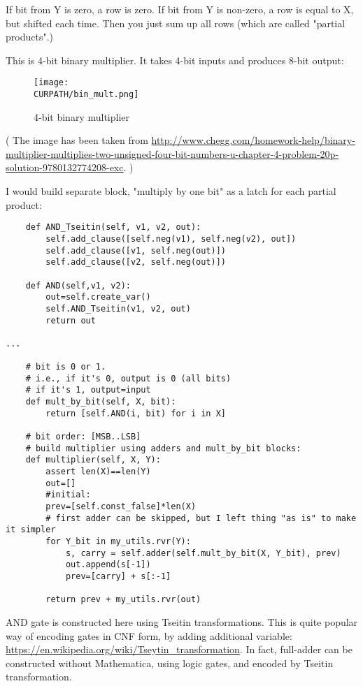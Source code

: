 If bit from Y is zero, a row is zero.
If bit from Y is non-zero, a row is equal to X, but shifted each time.
Then you just sum up all rows (which are called "partial products".)

This is 4-bit binary multiplier. It takes 4-bit inputs and produces 8-bit output:

\begin{figure}[H]
\centering
\texttt{[image: \\CURPATH/bin\_mult.png]}
\caption{4-bit binary multiplier}
\end{figure}

( The image has been taken from \url{http://www.chegg.com/homework-help/binary-multiplier-multiplies-two-unsigned-four-bit-numbers-u-chapter-4-problem-20p-solution-9780132774208-exc}. )

I would build separate block, "multiply by one bit" as a latch for each partial product:

\begin{lstlisting}
    def AND_Tseitin(self, v1, v2, out):
        self.add_clause([self.neg(v1), self.neg(v2), out])
        self.add_clause([v1, self.neg(out)])
        self.add_clause([v2, self.neg(out)])
    
    def AND(self,v1, v2):
        out=self.create_var()
        self.AND_Tseitin(v1, v2, out)
        return out

...

    # bit is 0 or 1.
    # i.e., if it's 0, output is 0 (all bits)
    # if it's 1, output=input
    def mult_by_bit(self, X, bit):
        return [self.AND(i, bit) for i in X]

    # bit order: [MSB..LSB]
    # build multiplier using adders and mult_by_bit blocks:
    def multiplier(self, X, Y):
        assert len(X)==len(Y)
        out=[]
        #initial:
        prev=[self.const_false]*len(X)
        # first adder can be skipped, but I left thing "as is" to make it simpler
        for Y_bit in my_utils.rvr(Y):
            s, carry = self.adder(self.mult_by_bit(X, Y_bit), prev)
            out.append(s[-1])
            prev=[carry] + s[:-1]
    
        return prev + my_utils.rvr(out)
\end{lstlisting}

AND gate is constructed here using Tseitin transformations.
This is quite popular way of encoding gates in CNF form, by adding additional variable:
\url{https://en.wikipedia.org/wiki/Tseytin_transformation}.
In fact, full-adder can be constructed without Mathematica, using logic gates, and encoded by Tseitin transformation.

